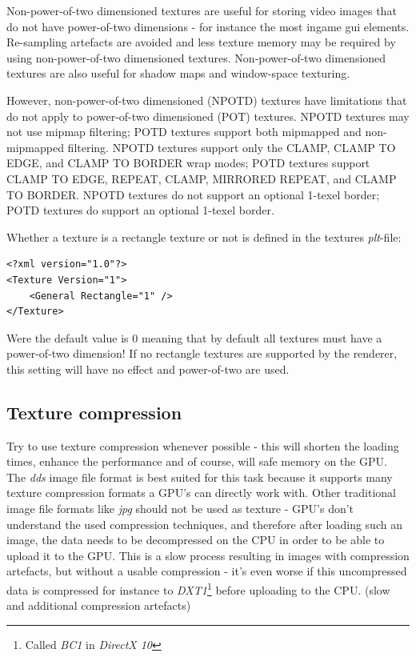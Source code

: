 Non-power-of-two dimensioned textures are useful for storing video images that do not have power-of-two dimensions - for instance the most ingame gui elements. Re-sampling artefacts are avoided and less texture memory may be required by using non-power-of-two dimensioned textures. Non-power-of-two dimensioned textures are also useful for shadow maps and window-space texturing.

However, non-power-of-two dimensioned (NPOTD) textures have limitations that do not apply to power-of-two dimensioned (POT) textures. NPOTD textures may not use mipmap filtering; POTD textures support both mipmapped and non-mipmapped filtering. NPOTD textures support only the CLAMP, CLAMP TO EDGE, and CLAMP TO BORDER wrap modes; POTD textures support CLAMP TO EDGE, REPEAT, CLAMP, MIRRORED REPEAT, and CLAMP TO BORDER. NPOTD textures do not support an optional 1-texel border;
POTD textures do support an optional 1-texel border.

Whether a texture is a rectangle texture or not is defined in the textures \emph{plt}-file:

\begin{lstlisting}[caption=\emph{plt}-file rectangle texture setup]
<?xml version="1.0"?>
<Texture Version="1">
    <General Rectangle="1" />
</Texture>
\end{lstlisting}

Were the default value is 0 meaning that by default all textures must have a power-of-two dimension! If no rectangle textures are supported by the renderer, this setting will have no effect and power-of-two are used.




\subsection{Texture compression}
Try to use texture compression whenever possible - this will shorten the loading times, enhance the performance and of course, will safe memory on the GPU. The \emph{dds} image file format is best suited for this task because it supports many texture compression formats a GPU's can directly work with. Other traditional image file formats like \emph{jpg} should not be used as texture - GPU's don't understand the used compression techniques, and therefore after loading such an image, the data needs to be decompressed on the CPU in order to be able to upload it to the GPU. This is a slow process resulting in images with compression artefacts, but without a usable compression - it's even worse if this uncompressed data is compressed for instance to \emph{DXT1}\footnote{Called \emph{BC1} in \emph{DirectX 10}} before uploading to the CPU. (slow and additional compression artefacts)

